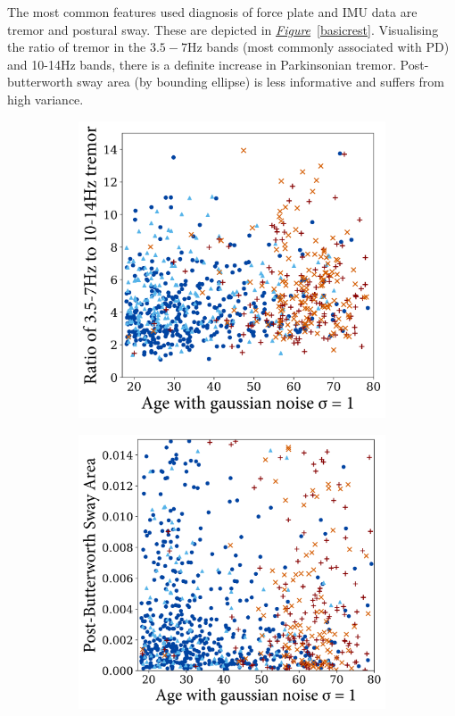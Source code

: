 \documentclass[12pt, twoside]{book}
\begin{document}
The most common features used diagnosis of force plate and IMU data are tremor and postural sway. These are depicted in \textit{\hyperref[basicrest]{Figure}}~\ref{basicrest}. Visualising the ratio of tremor in the $3.5-7$Hz bands (most commonly associated with PD) and 10-14Hz bands, there is a definite increase in Parkinsonian tremor. Post-butterworth sway area (by bounding ellipse) is less informative and suffers from high variance.

\begin{figure}[h]
	\centering
	\begin{subfigure}{.42\textwidth}
		\centering
		\includegraphics[width=0.96\linewidth]{resttremor.png}
	\end{subfigure}%
	\begin{subfigure}{.42\textwidth}
		\centering
		\includegraphics[width=0.96\linewidth]{bwswayarea.png}

\end{subfigure}
\end{figure}
\end{document}
